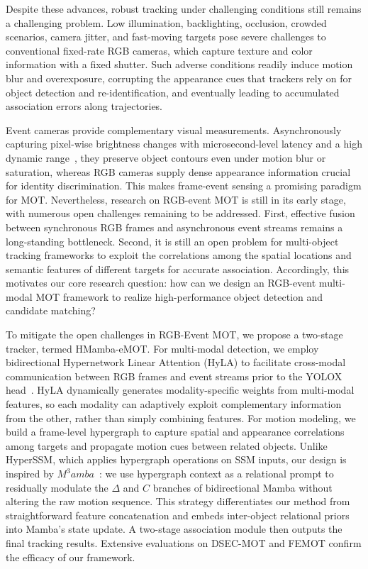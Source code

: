 \documentclass[10pt,twocolumn,letterpaper]{article}
\begin{document}
Despite these advances, robust tracking under challenging conditions still remains a challenging problem. Low illumination, backlighting, occlusion, crowded scenarios, camera jitter, and fast-moving targets pose severe challenges to conventional fixed-rate RGB cameras, which capture texture and color information with a fixed shutter. Such adverse conditions readily induce motion blur and overexposure, corrupting the appearance cues that trackers rely on for object detection and re-identification, and eventually leading to accumulated association errors along trajectories.


Event cameras provide complementary visual measurements. Asynchronously capturing pixel-wise brightness changes with microsecond-level latency and a high dynamic range~\cite{gallego2022event}, they preserve object contours even under motion blur or saturation, whereas RGB cameras supply dense appearance information crucial for identity discrimination. This makes frame-event sensing a promising paradigm for MOT. Nevertheless, research on RGB-event MOT is still in its early stage, with numerous open challenges remaining to be addressed. First, effective fusion between synchronous RGB frames and asynchronous event streams remains a long-standing bottleneck. Second, it is still an open problem for multi-object tracking frameworks to exploit the correlations among the spatial locations and semantic features of different targets for accurate association. Accordingly, this motivates our core research question: how can we design an RGB-event multi-modal MOT framework to realize high-performance object detection and candidate matching? 


To mitigate the open challenges in RGB-Event MOT, we propose a two-stage tracker, termed HMamba-eMOT. For multi-modal detection, we employ bidirectional Hypernetwork Linear Attention (HyLA) to facilitate cross-modal communication between RGB frames and event streams prior to the YOLOX head~\cite{ge2021yolox}. HyLA dynamically generates modality-specific weights from multi-modal features, so each modality can adaptively exploit complementary information from the other, rather than simply combining features. For motion modeling, we build a frame-level hypergraph to capture spatial and appearance correlations among targets and propagate motion cues between related objects. Unlike HyperSSM, which applies hypergraph operations on SSM inputs, our design is inspired by $M^3amba$~\cite{jing2026m3amba}: we use hypergraph context as a relational prompt to residually modulate the $\Delta$ and $C$ branches of bidirectional Mamba without altering the raw motion sequence. This strategy differentiates our method from straightforward feature concatenation and embeds inter-object relational priors into Mamba’s state update. A two-stage association module then outputs the final tracking results. Extensive evaluations on DSEC-MOT and FEMOT confirm the efficacy of our framework. 
\end{document}
